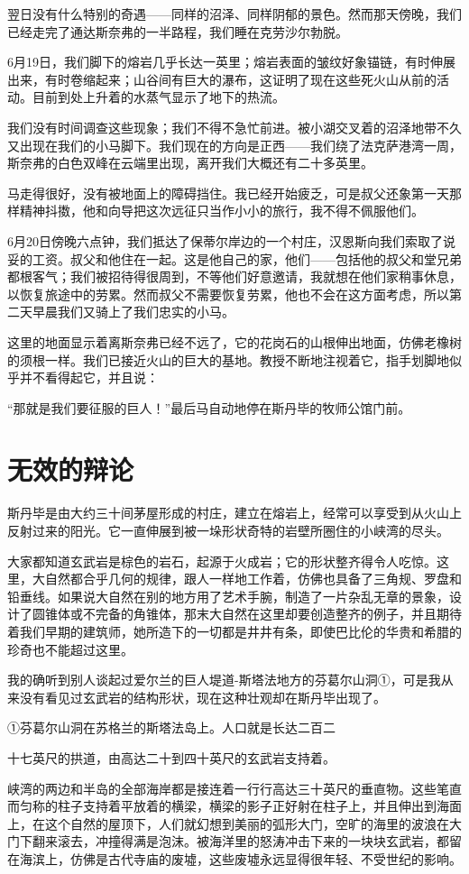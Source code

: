 \documentclass[10pt]{book}
\begin{document}
翌日没有什么特别的奇遇——同样的沼泽、同样阴郁的景色。然而那天傍晚，我们已经走完了通达斯奈弗的一半路程，我们睡在克劳沙尔勃脱。

6月19日，我们脚下的熔岩几乎长达一英里；熔岩表面的皱纹好象锚链，有时伸展出来，有时卷缩起来；山谷间有巨大的瀑布，这证明了现在这些死火山从前的活动。目前到处上升着的水蒸气显示了地下的热流。

我们没有时间调查这些现象；我们不得不急忙前进。被小湖交叉着的沼泽地带不久又出现在我们的小马脚下。我们现在的方向是正西——我们绕了法克萨港湾一周，斯奈弗的白色双峰在云端里出现，离开我们大概还有二十多英里。

马走得很好，没有被地面上的障碍挡住。我已经开始疲乏，可是叔父还象第一天那样精神抖擞，他和向导把这次远征只当作小小的旅行，我不得不佩服他们。

6月20日傍晚六点钟，我们抵达了保蒂尔岸边的一个村庄，汉恩斯向我们索取了说妥的工资。叔父和他住在一起。这是他自己的家，他们——包括他的叔父和堂兄弟都根客气；我们被招待得很周到，不等他们好意邀请，我就想在他们家稍事休息，以恢复旅途中的劳累。然而叔父不需要恢复劳累，他也不会在这方面考虑，所以第二天早晨我们又骑上了我们忠实的小马。

这里的地面显示着离斯奈弗已经不远了，它的花岗石的山根伸出地面，仿佛老橡树的须根一样。我们已接近火山的巨大的基地。教授不断地注视着它，指手划脚地似乎并不看得起它，并且说：

“那就是我们要征服的巨人！”最后马自动地停在斯丹毕的牧师公馆门前。
\chapter{无效的辩论}
斯丹毕是由大约三十间茅屋形成的村庄，建立在熔岩上，经常可以享受到从火山上反射过来的阳光。它一直伸展到被一垛形状奇特的岩壁所圈住的小峡湾的尽头。

大家都知道玄武岩是棕色的岩石，起源于火成岩；它的形状整齐得令人吃惊。这里，大自然都合乎几何的规律，跟人一样地工作着，仿佛也具备了三角规、罗盘和铅垂线。如果说大自然在别的地方用了艺术手腕，制造了一片杂乱无章的景象，设计了圆锥体或不完备的角锥体，那末大自然在这里却要创造整齐的例子，并且期待着我们早期的建筑师，她所造下的一切都是井井有条，即使巴比伦的华贵和希腊的珍奇也不能超过这里。

我的确听到别人谈起过爱尔兰的巨人堤道-斯塔法地方的芬葛尔山洞①，可是我从来没有看见过玄武岩的结构形状，现在这种壮观却在斯丹毕出现了。

①芬葛尔山洞在苏格兰的斯塔法岛上。人口就是长达二百二

十七英尺的拱道，由高达二十到四十英尺的玄武岩支持着。

峡湾的两边和半岛的全部海岸都是接连着一行行高达三十英尺的垂直物。这些笔直而匀称的柱子支持着平放着的横梁，横梁的影子正好射在柱子上，并且伸出到海面上，在这个自然的屋顶下，人们就幻想到美丽的弧形大门，空旷的海里的波浪在大门下翻来滚去，冲撞得满是泡沫。被海洋里的怒涛冲击下来的一块块玄武岩，都留在海滨上，仿佛是古代寺庙的废墟，这些废墟永远显得很年轻、不受世纪的影响。
\end{document}
